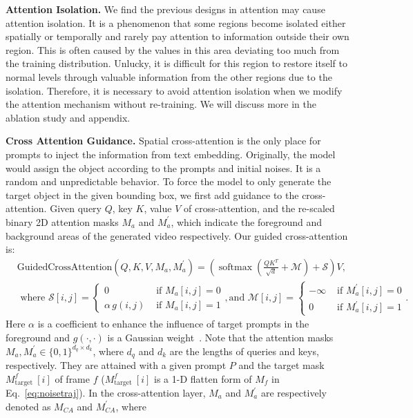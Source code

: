 \noindent\textbf{Attention Isolation.} We find the previous designs in attention may cause attention isolation. It is a phenomenon that some regions become isolated either spatially or temporally and rarely pay attention to information outside their own region. This is often caused by the values in this area deviating too much from the training distribution. Unlucky, it is difficult for this region to restore itself to normal levels through valuable information from the other regions due to the isolation. Therefore, it is necessary to avoid attention isolation when we modify the attention mechanism without re-training.
%
We will discuss more in the ablation study and appendix.

\noindent\textbf{Cross Attention Guidance.} Spatial cross-attention is the only place for prompts to inject the information from text embedding. Originally, the model would assign the object according to the prompts and initial noises. It is a random and unpredictable behavior. To force the model to only generate the target object in the given bounding box, we first add guidance to the cross-attention. Given query $Q$, key $K$, value $V$ of cross-attention, and the re-scaled binary 2D attention masks $M_a$ and $M_a^{\prime}$, which indicate the foreground and background areas of the generated video respectively. Our guided cross-attention is:
%
\begin{equation}
\begin{aligned}
& \text {GuidedCrossAttention}(Q, K, V, M_a, M_a^{\prime})=(\operatorname{softmax}\left(\frac{Q {K}^T}{\sqrt{d}} + \mathcal{M}\right) + \mathcal{S}) V, \\
& \text { where } \mathcal{S}[i, j]= \begin{cases}0 & \text { if } M_a[i, j]=0 \\
\alpha \, g(i, j) & \text { if } M_a[i, j]=1\end{cases}, 
\text{and } \mathcal{M}[i, j]= \begin{cases}-\infty & \text { if } {M_a^{\prime}}[i, j]=0 \\
0 & \text { if } {M_a^{\prime}}[i, j]=1\end{cases}.
\end{aligned}
\label{eq:ca}
\end{equation}
%
Here $\alpha$ is a coefficient to enhance the influence of target prompts in the foreground and $g(\cdot, \cdot)$ is a Gaussian weight~\citep{ma2023trailblazer}.
%
Note that the attention masks $M_a, M_a^{\prime} \in\{0,1\}^{d_q \times d_k}$, where $d_q$ and $d_k$ are the lengths of queries and keys, respectively. They are attained with a given prompt $P$ and the target mask $M_{\text {target }}^f[i]$ of frame $f$ ($M_{\text {target }}^f[i]$ is a 1-D flatten form of $M_f$ in Eq.~\ref{eq:noisetraj}). In the cross-attention layer, $M_a$ and $M_a^{\prime}$ are respectively denoted as $M_{CA}$ and $M^{\prime}_{CA}$, where 
